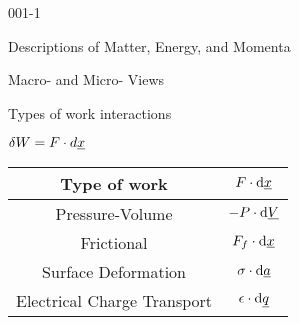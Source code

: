 \begin{mitframe}{001-1}

{	\centering
\begin{listone}
    
    \item Descriptions of Matter, Energy, and Momenta
    
    \item Macro- and Micro- Views
    
\end{listone}

        
Types of work interactions
                
$\blthick\work = \force \cdot d\exvecone$
        
\bigskip
        
        
        
                
\begin{tabular}{ | c | c |  }
        
	\hline
            
	Type of work & $\force \cdot \mathrm{d}\exvecone$ \\
            
	\hline
            
	Pressure-Volume & $-\p \cdot \mathrm{d}\uline{\vol}$ \\
            
	\hline
            
	Frictional & $\fricforce \cdot \mathrm{d}\exvecone$ \\
            
	\hline
            
	Surface Deformation & $\bound \cdot \mathrm{d}\uline{\activity}$ \\
            
	\hline                            %
            
	Electrical Charge Transport & $\dielec \cdot \mathrm{d}\uline{\heatflux}$ \\
            
	\hline                           %
            

\end{tabular}}
\end{mitframe}
